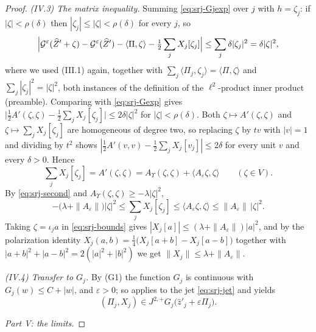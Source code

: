 \begin{proof}
\emph{(IV.3) The matrix inequality.}
Summing \eqref{eq:srj-Gjexp} over $j$ with $h=\zeta_j$: if $|\zeta|<\rho(\delta)$
then $|\zeta_j|\le|\zeta|<\rho(\delta)$ for every $j$, so
\[
  \Bigl|\mathcal G^\varepsilon(\widehat Z'+\zeta)
   -\mathcal G^\varepsilon(\widehat Z')-\langle\Pi,\zeta\rangle
   -\tfrac12\sum_jX_j[\zeta_j]\Bigr|\le\sum_j\delta|\zeta_j|^2=\delta|\zeta|^2,
\]
where we used (III.1) again, together with $\sum_j\langle\Pi_j,\zeta_j\rangle
=\langle\Pi,\zeta\rangle$ and $\sum_j|\zeta_j|^2=|\zeta|^2$, both instances of
the definition of the $\ell^2$-product inner product (preamble). Comparing with
\eqref{eq:srj-Gexp} gives
$\bigl|\tfrac12A'(\zeta,\zeta)-\tfrac12\sum_jX_j[\zeta_j]\bigr|
\le2\delta|\zeta|^2$ for $|\zeta|<\rho(\delta)$. Both
$\zeta\mapsto A'(\zeta,\zeta)$ and $\zeta\mapsto\sum_jX_j[\zeta_j]$ are
homogeneous of degree two, so replacing $\zeta$ by $tv$ with $|v|=1$ and
dividing by $t^2$ shows
$|\tfrac12A'(v,v)-\tfrac12\sum_jX_j[v_j]|\le2\delta$ for every unit $v$ and
every $\delta>0$. Hence
\begin{equation}\label{eq:srj-diag}
  \sum_jX_j[\zeta_j]=A'(\zeta,\zeta)
   =A_\Upsilon(\zeta,\zeta)+\langle A_\varepsilon\zeta,\zeta\rangle
  \qquad(\zeta\in V).
\end{equation}
By \eqref{eq:srj-second} and $A_\Upsilon(\zeta,\zeta)\ge-\lambda|\zeta|^2$,
\begin{equation}\label{eq:srj-bounds}
  -\bigl(\lambda+\|A_\varepsilon\|\bigr)|\zeta|^2
   \le\sum_jX_j[\zeta_j]\le\langle A_\varepsilon\zeta,\zeta\rangle
   \le\|A_\varepsilon\|\,|\zeta|^2 .
\end{equation}
Taking $\zeta=\iota_ja$ in \eqref{eq:srj-bounds} gives
$|X_j[a]|\le(\lambda+\|A_\varepsilon\|)|a|^2$, and by the polarization identity
$X_j(a,b)=\tfrac14\bigl(X_j[a+b]-X_j[a-b]\bigr)$ together with
$|a+b|^2+|a-b|^2=2(|a|^2+|b|^2)$ we get
$\|X_j\|\le\lambda+\|A_\varepsilon\|$.

\emph{(IV.4) Transfer to $G_j$.}
By (G1) the function $G_j$ is continuous with $G_j(w)\le C+|w|$, and
$\varepsilon>0$; so  applies to the jet
\eqref{eq:srj-jet} and yields
\begin{equation}\label{eq:srj-magic}
  (\Pi_j,X_j)\in J^{2,+}G_j\bigl(\widehat z'_j+\varepsilon\Pi_j\bigr).
\end{equation}

\medskip\noindent\emph{Part V: the limits.}


\end{proof}
